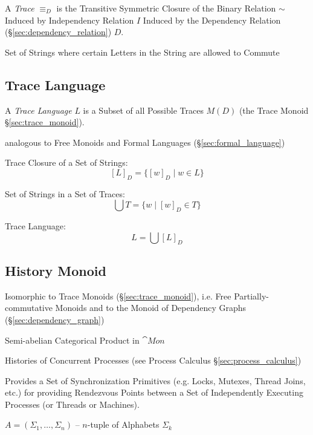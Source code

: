A \emph{Trace} $\equiv_D$ is the Transitive Symmetric Closure of the
Binary Relation $\sim$ Induced by Independency Relation $I$ Induced by
the Dependency Relation (\S\ref{sec:dependency_relation}) $D$.

Set of Strings where certain Letters in the String are allowed to
Commute



\subsection{Trace Language}\label{sec:trace_language}

A \emph{Trace Language} $L$ is a Subset of all Possible Traces $M(D)$
(the Trace Monoid \S\ref{sec:trace_monoid}).

analogous to Free Monoids and Formal Languages
(\S\ref{sec:formal_language})

Trace Closure of a Set of Strings:
\[
  [L]_D = \{[w]_D \mid w \in L\}
\]

Set of Strings in a Set of Traces:
\[
  \bigcup T = \{w \mid [w]_D \in T\}
\]

Trace Language:
\[
  L = \bigcup [L]_D
\]



\subsection{History Monoid}\label{sec:history_monoid}

Isomorphic to Trace Monoids (\S\ref{sec:trace_monoid}), i.e. Free
Partially-commutative Monoids and to the Monoid of Dependency Graphs
(\S\ref{sec:dependency_graph})

Semi-abelian Categorical Product in $\cat{Mon}$

Histories of Concurrent Processes (see Process Calculus
\S\ref{sec:process_calculus})

Provides a Set of Synchronization Primitives (e.g. Locks, Mutexes,
Thread Joins, etc.) for providing Rendezvous Points between a Set of
Independently Executing Processes (or Threads or Machines).

$A = (\Sigma_1, \ldots, \Sigma_n)$ -- $n$-tuple of Alphabets
$\Sigma_k$

